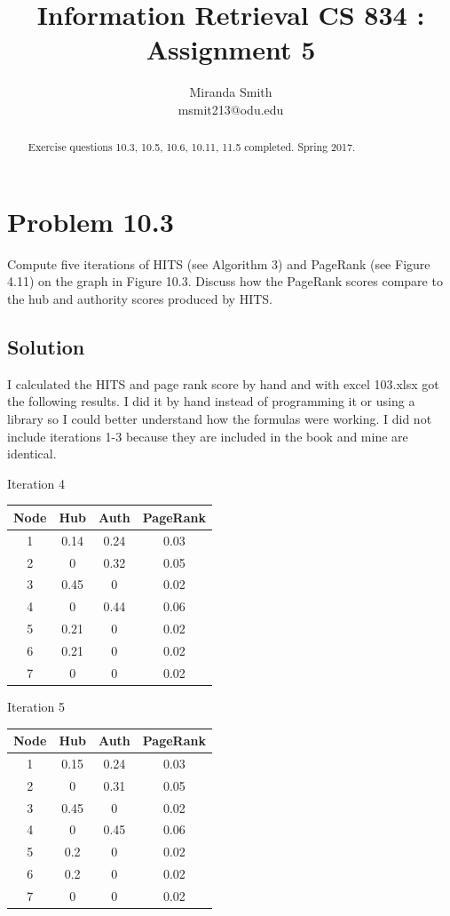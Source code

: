 \documentclass[letterpaper,12pt]{article}
\title{Information Retrieval CS 834 : Assignment 5}
\author{Miranda Smith\\ msmit213@odu.edu}
\begin{document}
\maketitle
\date{}

\begin{abstract}
Exercise questions 10.3, 10.5, 10.6, 10.11, 11.5 completed. Spring 2017. 
\end{abstract}

\pagebreak

\section{Problem 10.3}
 Compute five iterations of HITS (see Algorithm 3) and PageRank (see Figure 4.11) on the graph in Figure 10.3. Discuss how the PageRank scores compare to the hub and authority scores produced by HITS.

\subsection{Solution}
I calculated the HITS and page rank score by hand and with excel 103.xlsx  got the following results. I did it by hand instead of programming it or using a library so I could better understand how the formulas were working. I did not include iterations 1-3 because they are included in the book and mine are identical.

\begin{center}
Iteration 4
\begin{tabular}{ |c|c|c|c| } 
 \hline
 Node & Hub & Auth & PageRank \\ 
 \hline
 1 & 0.14 & 0.24 & 0.03 \\ 
 \hline
 2 &0  & 0.32 &0.05\\ 
 \hline
 3 & 0.45 &  0 &0.02\\ 
 \hline
 4 &0  &  0.44&0.06\\ 
 \hline
 5 & 0.21 & 0 &0.02\\ 
 \hline
 6 & 0.21 & 0 &0.02\\ 
 \hline
 7 & 0 & 0 &0.02\\ 
 \hline
\end{tabular}
\end{center}

\begin{center}
Iteration 5
\begin{tabular}{ |c|c|c|c| } 
 \hline
 Node & Hub & Auth & PageRank \\ 
 \hline
 1 & 0.15 & 0.24 & 0.03 \\ 
 \hline
 2 &0  & 0.31 &0.05\\ 
 \hline
 3 & 0.45 &  0 &0.02\\ 
 \hline
 4 &0  &  0.45&0.06\\ 
 \hline
 5 & 0.2 & 0 &0.02\\ 
 \hline
 6 & 0.2 & 0 &0.02\\ 
 \hline
 7 & 0 & 0 &0.02\\ 
 \hline
\end{tabular}
\end{center}
\end{document}
